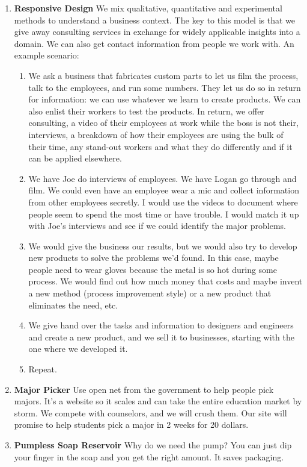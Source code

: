 \documentclass[paper=a4, fontsize=11pt]{scrartcl} %
\numberwithin{equation}{section} %
\numberwithin{figure}{section} %
\numberwithin{table}{section} %
\begin{document}
\begin{enumerate}
\item \textbf{Responsive Design}  We mix qualitative, quantitative and experimental methods to understand a business context.  The key to this model is that we give away consulting services in exchange for widely applicable insights into a domain.  We can also get contact information from people we work with.  An example scenario:
\begin{enumerate}
\item We ask a business that fabricates custom parts to let us film the process, talk to the employees, and run some numbers.  They let us do so in return for information: we can use whatever we learn to create products.  We can also enlist their workers to test the products.  In return, we offer consulting, a video of their employees at work while the boss is not their, interviews, a breakdown of how their employees are using the bulk of their time, any stand-out workers and what they do differently and if it can be applied elsewhere.
\item We have Joe do interviews of employees.  We have Logan go through and film.  We could even have an employee wear a mic and collect information from other employees secretly.  I would use the videos to document where people seem to spend the most time or have trouble.  I would match it up with Joe's interviews and see if we could identify the major problems.
\item We would give the business our results, but we would also try to develop new products to solve the problems we'd found.  In this case, maybe people need to wear gloves because the metal is so hot during some process.  We would find out how much money that costs and maybe invent a new method (process improvement style) or a new product that eliminates the need, etc.
\item We give hand over the tasks and information to designers and engineers and create a new product, and we sell it to businesses, starting with the one where we developed it.
\item Repeat.
\end{enumerate}

\item \textbf{Major Picker} Use open net from the government to help people pick majors.  It's a website so it scales and can take the entire education market by storm.  We compete with counselors, and we will crush them.  Our site will promise to help students pick a major in 2 weeks for 20 dollars.

\item \textbf{Pumpless Soap Reservoir}  Why do we need the pump?  You can just dip your finger in the soap and you get the right amount.  It saves packaging.  


\end{enumerate}
\end{document}
